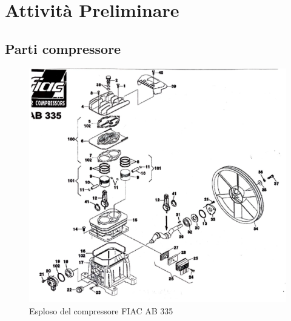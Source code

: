 \section{Attività Preliminare}
\subsection{Parti compressore}
\begin{figure}[h]
    \centering
    \includegraphics[scale=0.7]{Immagini/EsplosoCompressore.png}
    \caption{Esploso del compressore FIAC AB 335}
        \label{fig:EsplosoCompressore}
\end{figure}
\hspace{-1.3cm}
